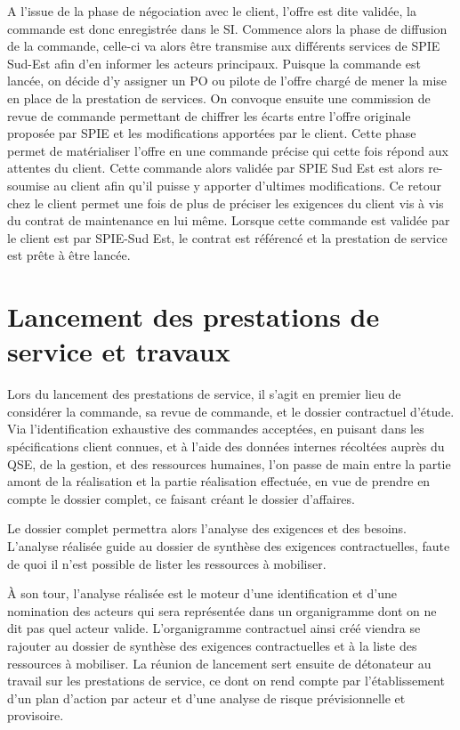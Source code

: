A l’issue de la phase de négociation avec le client, l’offre est dite validée, la commande est donc enregistrée dans le SI. Commence alors la phase de diffusion de la commande, celle-ci va alors être transmise aux différents services de SPIE Sud-Est afin d’en informer les acteurs principaux. Puisque la commande est lancée, on décide d’y assigner un PO ou pilote de l’offre chargé de mener la mise en place de la prestation de services. On convoque ensuite une commission de revue de commande permettant de chiffrer les écarts entre l’offre originale proposée par SPIE et les modifications apportées par le client. Cette phase permet de matérialiser l’offre en une commande précise qui cette fois répond aux attentes du client. Cette commande alors validée par SPIE Sud Est est alors re-soumise au client afin qu’il puisse y apporter d’ultimes modifications. Ce retour chez le client permet une fois de plus de préciser les exigences du client vis à vis du contrat de maintenance en lui même. Lorsque cette commande est validée par le client est par SPIE-Sud Est, le contrat est référencé et la prestation de service est prête à être lancée.

\section{Lancement des prestations de service et travaux}

Lors du lancement des prestations de service, il s’agit en premier lieu de considérer la commande, sa revue de commande, et le dossier contractuel d’étude. Via l’identification exhaustive des commandes acceptées, en puisant dans les spécifications client connues, et à l’aide des données internes récoltées auprès du QSE, de la gestion, et des ressources humaines, l’on passe de main entre la partie amont de la réalisation et la partie réalisation effectuée, en vue de prendre en compte le dossier complet, ce faisant créant le dossier d’affaires.

Le dossier complet permettra alors l’analyse des exigences et des besoins. L’analyse réalisée guide au dossier de synthèse des exigences contractuelles, faute de quoi il n’est possible de lister les ressources à mobiliser.

À son tour, l’analyse réalisée est le moteur d’une identification et d’une nomination des acteurs qui sera représentée dans un organigramme dont on ne dit pas quel acteur valide. L’organigramme contractuel ainsi créé viendra se rajouter au dossier de synthèse des exigences contractuelles et à la liste des ressources à mobiliser. La réunion de lancement sert ensuite de détonateur au travail sur les prestations de service, ce dont on rend compte par l’établissement d’un plan d’action par acteur et d’une analyse de risque prévisionnelle et provisoire.

